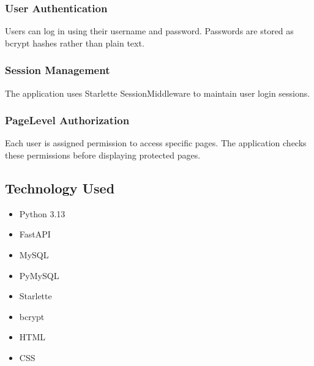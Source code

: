 \documentclass[letterpaper,10pt,english]{sphinxmanual}
\begin{document}
\subsubsection{User Authentication}
\label{\detokenize{overview:user-authentication}}
\sphinxAtStartPar
Users can log in using their username and password. Passwords are stored
as bcrypt hashes rather than plain text.


\subsubsection{Session Management}
\label{\detokenize{overview:session-management}}
\sphinxAtStartPar
The application uses Starlette SessionMiddleware to maintain user login
sessions.


\subsubsection{Page\sphinxhyphen{}Level Authorization}
\label{\detokenize{overview:page-level-authorization}}
\sphinxAtStartPar
Each user is assigned permission to access specific pages. The application
checks these permissions before displaying protected pages.


\subsection{Technology Used}
\label{\detokenize{overview:technology-used}}\begin{itemize}
\item {} 
\sphinxAtStartPar
Python 3.13

\item {} 
\sphinxAtStartPar
FastAPI

\item {} 
\sphinxAtStartPar
MySQL

\item {} 
\sphinxAtStartPar
PyMySQL

\item {} 
\sphinxAtStartPar
Starlette

\item {} 
\sphinxAtStartPar
bcrypt

\item {} 
\sphinxAtStartPar
HTML

\item {} 
\sphinxAtStartPar
CSS

\end{itemize}
\end{document}
